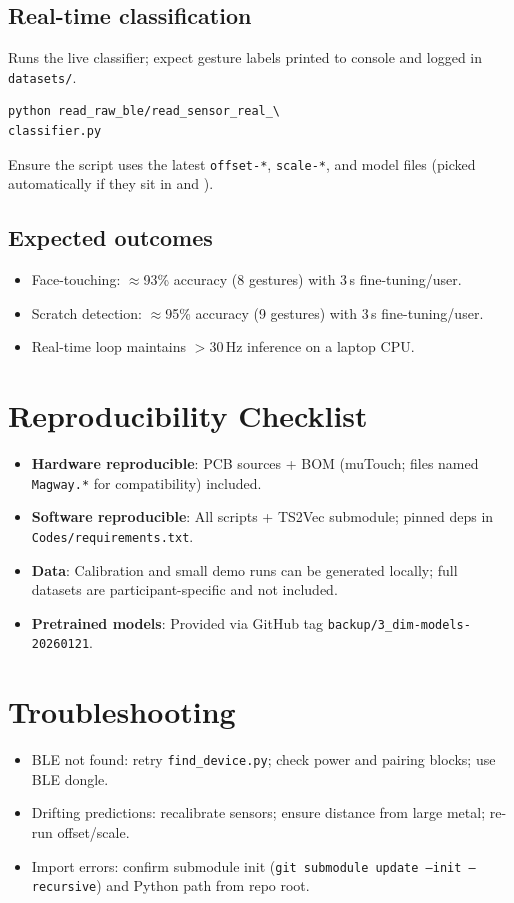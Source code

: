 \documentclass[conference]{IEEEtran}
\begin{document}
\subsection{Real-time classification}
\noindent Runs the live classifier; expect gesture labels printed to console and logged in \texttt{datasets/}.
\begin{verbatim}
python read_raw_ble/read_sensor_real_\
classifier.py
\end{verbatim}
Ensure the script uses the latest \texttt{offset-*}, \texttt{scale-*}, and model files (picked automatically if they sit in  and ).

\subsection{Expected outcomes}
\begin{itemize}
  \item Face-touching: $\approx$93\% accuracy (8 gestures) with 3\,s fine-tuning/user.
  \item Scratch detection: $\approx$95\% accuracy (9 gestures) with 3\,s fine-tuning/user.
  \item Real-time loop maintains $>$30\,Hz inference on a laptop CPU.
\end{itemize}

\section{Reproducibility Checklist}
\begin{itemize}
  \item \textbf{Hardware reproducible}: PCB sources + BOM (muTouch; files named \texttt{Magway.*} for compatibility) included.
  \item \textbf{Software reproducible}: All scripts + TS2Vec submodule; pinned deps in \texttt{Codes/requirements.txt}.
  \item \textbf{Data}: Calibration and small demo runs can be generated locally; full datasets are participant-specific and not included.
  \item \textbf{Pretrained models}: Provided via GitHub tag \texttt{backup/3\_dim-models-20260121}.
\end{itemize}

\section{Troubleshooting}
\begin{itemize}
  \item BLE not found: retry \texttt{find\_device.py}; check power and pairing blocks; use BLE dongle.
  \item Drifting predictions: recalibrate sensors; ensure distance from large metal; re-run offset/scale.
  \item Import errors: confirm submodule init (\texttt{git submodule update --init --recursive}) and Python path from repo root.
\end{itemize}
\end{document}

